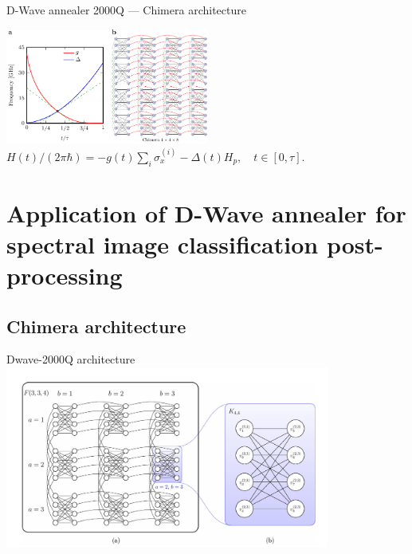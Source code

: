 \begin{frame}{D-Wave annealer 2000Q --- Chimera architecture}
    \begin{center}
    \includegraphics[width=0.5\textwidth]{pics/adiabatic/Fig_1.pdf}\\
    $H(t)/(2\pi\hbar)= -g(t) \sum_{i} \sigma^{(i)}_x -\Delta(t) H_p,
                \quad
                t \in [0, \tau].$
    \end{center}

\end{frame}
\endgroup
\section{Application of D-Wave annealer for spectral image classification post-processing}
\subsection{Chimera architecture}
\begin{frame}{Dwave-2000Q architecture}
    \centering
    \includegraphics[width=0.8\textwidth]{pics/adiabatic/chimera.pdf}
\end{frame}
